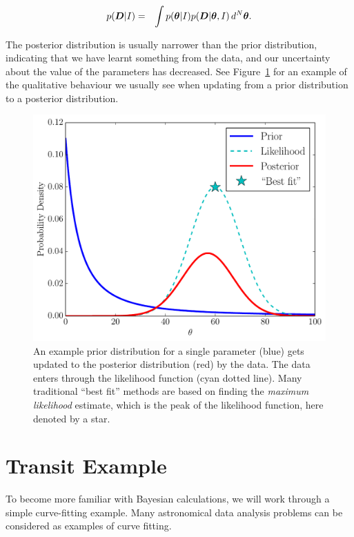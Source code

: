 \begin{eqnarray}
p(\boldsymbol{D} | I) &=& \int p(\boldsymbol{\theta} | I)p(\boldsymbol{D} | \boldsymbol{\theta}, I) \, d^N \boldsymbol{\theta}.
\end{eqnarray}

The posterior distribution is usually narrower than the prior distribution,
indicating that we have learnt something from the data, and our uncertainty
about the value of the parameters has decreased. See
Figure~\ref{fig:bayes} for an example of the qualitative behaviour we usually
see when updating from a prior distribution to a posterior distribution.

\begin{figure}
\begin{center}
\includegraphics[scale=0.5]{bayes.pdf}
\caption{An example prior distribution for a single parameter (blue)
gets updated to the posterior distribution (red) by the data. The data
enters through the likelihood function (cyan dotted line). Many traditional
``best fit'' methods are based on finding the {\it maximum likelihood}
estimate, which is the peak of the likelihood function, here denoted by a
star.
\label{fig:bayes}}
\end{center}
\end{figure}

\section{Transit Example}
To become more familiar with Bayesian calculations, we will work through a
simple curve-fitting example. Many astronomical data analysis problems can be
considered as examples of curve fitting.

